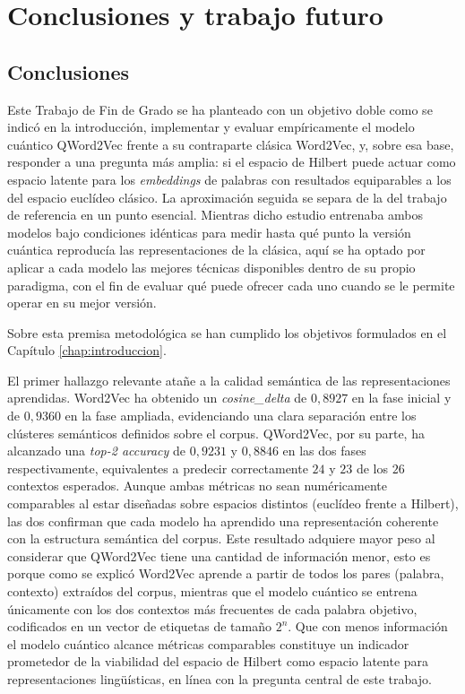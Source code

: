 \chapter{Conclusiones y trabajo futuro}
\label{chap:conclusiones}

\section{Conclusiones}

Este Trabajo de Fin de Grado se ha planteado con un objetivo doble como se indicó en la introducción, implementar y evaluar empíricamente el modelo cuántico QWord2Vec frente a su contraparte clásica Word2Vec, y, sobre esa base, responder a una pregunta más amplia: si el espacio de Hilbert puede actuar como espacio latente para los \textit{embeddings} de palabras con resultados equiparables a los del espacio euclídeo clásico. La aproximación seguida se separa de la del trabajo de referencia \cite{ohno_qword2vec_2025} en un punto esencial. Mientras dicho estudio entrenaba ambos modelos bajo condiciones idénticas para medir hasta qué punto la versión cuántica reproducía las representaciones de la clásica, aquí se ha optado por aplicar a cada modelo las mejores técnicas disponibles dentro de su propio paradigma, con el fin de evaluar qué puede ofrecer cada uno cuando se le permite operar en su mejor versión.

Sobre esta premisa metodológica se han cumplido los objetivos formulados en el Capítulo \ref{chap:introduccion}.

El primer hallazgo relevante atañe a la calidad semántica de las representaciones aprendidas. Word2Vec ha obtenido un \textit{cosine\_delta} de $0{,}8927$ en la fase inicial y de $0{,}9360$ en la fase ampliada, evidenciando una clara separación entre los clústeres semánticos definidos sobre el corpus. QWord2Vec, por su parte, ha alcanzado una \textit{top-2 accuracy} de $0{,}9231$ y $0{,}8846$ en las dos fases respectivamente, equivalentes a predecir correctamente $24$ y $23$ de los $26$ contextos esperados. Aunque ambas métricas no sean numéricamente comparables al estar diseñadas sobre espacios distintos (euclídeo frente a Hilbert), las dos confirman que cada modelo ha aprendido una representación coherente con la estructura semántica del corpus. Este resultado adquiere mayor peso al considerar que QWord2Vec tiene una cantidad de información menor, esto es porque como se explicó Word2Vec aprende a partir de todos los pares (palabra, contexto) extraídos del corpus, mientras que el modelo cuántico se entrena únicamente con los dos contextos más frecuentes de cada palabra objetivo, codificados en un vector de etiquetas de tamaño $2^n$. Que con menos información el modelo cuántico alcance métricas comparables constituye un indicador prometedor de la viabilidad del espacio de Hilbert como espacio latente para representaciones lingüísticas, en línea con la pregunta central de este trabajo.

